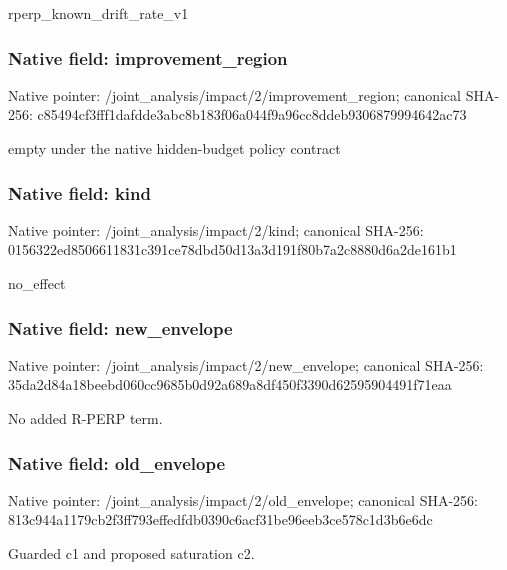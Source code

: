 \documentclass[10pt,a4paper]{article}
\begin{document}
\begingroup\raggedright\sloppy rperp\_\allowbreak{}known\_\allowbreak{}drift\_\allowbreak{}rate\_\allowbreak{}v1\par\endgroup

\subsubsection{Native field: improvement\_\allowbreak{}region}
Native pointer: /joint\_\allowbreak{}analysis/impact/2/improvement\_\allowbreak{}region; canonical SHA-256: c85494cf3fff1dafdde3abc8b183f06a044f9a96cc8ddeb9306879994642ac73

\begingroup\raggedright\sloppy empty under the native hidden-budget policy contract\par\endgroup

\subsubsection{Native field: kind}
Native pointer: /joint\_\allowbreak{}analysis/impact/2/kind; canonical SHA-256: 0156322ed8506611831c391ce78dbd50d13a3d191f80b7a2c8880d6a2de161b1

\begingroup\raggedright\sloppy no\_\allowbreak{}effect\par\endgroup

\subsubsection{Native field: new\_\allowbreak{}envelope}
Native pointer: /joint\_\allowbreak{}analysis/impact/2/new\_\allowbreak{}envelope; canonical SHA-256: 35da2d84a18beebd060cc9685b0d92a689a8df450f3390d62595904491f71eaa

\begingroup\raggedright\sloppy No added R-PERP term.\par\endgroup

\subsubsection{Native field: old\_\allowbreak{}envelope}
Native pointer: /joint\_\allowbreak{}analysis/impact/2/old\_\allowbreak{}envelope; canonical SHA-256: 813c944a1179cb2f3ff793effedfdb0390c6acf31be96eeb3ce578c1d3b6e6dc

\begingroup\raggedright\sloppy Guarded c1 and proposed saturation c2.\par\endgroup
\end{document}
